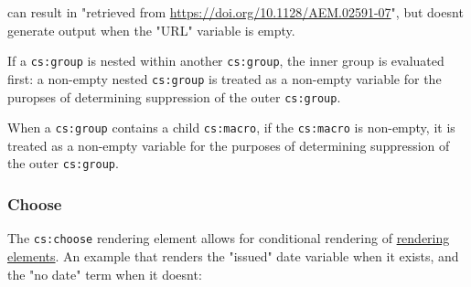 \begin{Shaded}
\begin{Highlighting}[]
\NormalTok{\textless{}}\NormalTok{\textgreater{}}
\NormalTok{  \textless{}}\NormalTok{\textgreater{}}
\NormalTok{    \textless{}}\NormalTok{/\textgreater{}}
\NormalTok{    \textless{}}\NormalTok{/\textgreater{}}
\NormalTok{    \textless{}}\NormalTok{/\textgreater{}}
\NormalTok{  \textless{}/}\NormalTok{\textgreater{}}
\NormalTok{\textless{}/}\NormalTok{\textgreater{}}
\end{Highlighting}
\end{Shaded}

can result in "retrieved from
\url{https://doi.org/10.1128/AEM.02591-07}", but doesn\textquotesingle t
generate output when the "URL" variable is empty.

If a \texttt{cs:group} is nested within another \texttt{cs:group}, the
inner group is evaluated first: a non-empty nested \texttt{cs:group} is
treated as a non-empty variable for the puropses of determining
suppression of the outer \texttt{cs:group}.

When a \texttt{cs:group} contains a child \texttt{cs:macro}, if the
\texttt{cs:macro} is non-empty, it is treated as a non-empty variable
for the purposes of determining suppression of the outer
\texttt{cs:group}.

\hypertarget{choose}{%
\subsubsection{Choose}\label{choose}}

The \texttt{cs:choose} rendering element allows for conditional
rendering of \protect\hyperlink{rendering-elements}{rendering elements}.
An example that renders the "issued" date variable when it exists, and
the "no date" term when it doesn\textquotesingle t:

\begin{Shaded}
\begin{Highlighting}[]
\NormalTok{\textless{}}\NormalTok{\textgreater{}}
\NormalTok{  \textless{}}\NormalTok{\textgreater{}}
\NormalTok{    \textless{}}\NormalTok{/\textgreater{}}
\NormalTok{  \textless{}/}\NormalTok{\textgreater{}}
\NormalTok{  \textless{}}\NormalTok{\textgreater{}}
\NormalTok{    \textless{}}\NormalTok{/\textgreater{}}
\NormalTok{  \textless{}/}\NormalTok{\textgreater{}}
\NormalTok{\textless{}/}\NormalTok{\textgreater{}}
\end{Highlighting}
\end{Shaded}

